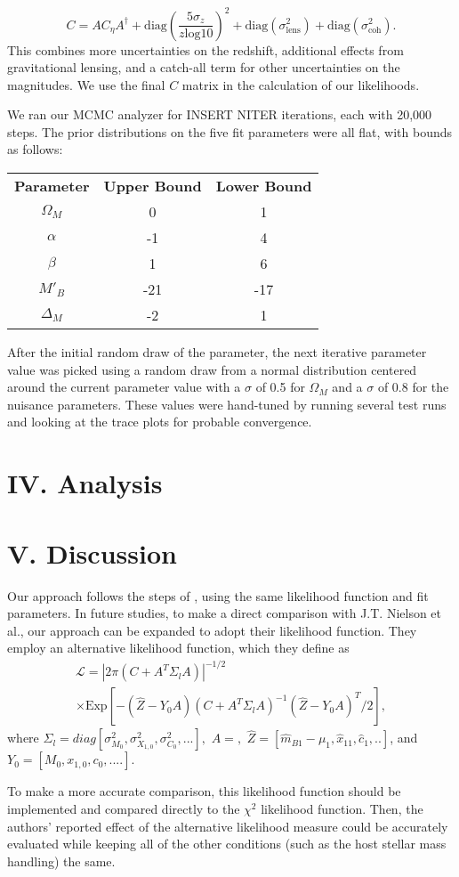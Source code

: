 \documentclass[aps,prl,reprint]{revtex4-1}
\begin{document}
$$C = A C_\eta A^\dagger + \text{diag}(\frac{5\sigma_z}{z \text{log} 10})^2 + \text{diag}(\sigma_\text{lens}^2) + \text{diag}(\sigma_{\text{coh}}^2). $$
This combines more uncertainties on the redshift, additional effects from gravitational lensing, and a catch-all term for other uncertainties on the magnitudes. We use the final $C$ matrix in the calculation of our likelihoods. 
\par We ran our MCMC analyzer for INSERT NITER iterations, each with 20,000 steps. The prior distributions on the five fit parameters were all flat, with bounds as follows:
\begin{center}
\begin{tabular}{ |c|c|c| } 
 \hline
 \textbf{Parameter} & \textbf{Upper Bound} & \textbf{Lower Bound} \\ 
 $\Omega_M$ & 0 & 1 \\ 
 $\alpha$ & -1 & 4 \\ 
 $\beta$ & 1 & 6 \\ 
 $M'_B$ & -21 & -17 \\ 
$\Delta_M$ & -2 & 1 \\ 
 \hline
\end{tabular}
\end{center}
\par After the initial random draw of the parameter, the next iterative parameter value was picked using a random draw from a normal distribution centered around the current parameter value with a $\sigma$ of 0.5 for $\Omega_M$ and a $\sigma$ of 0.8 for the nuisance parameters. These values were hand-tuned by running several test runs and looking at the trace plots for probable convergence. 
 
\section{IV. Analysis} 
\section{V. Discussion}
Our approach follows the steps of \cite{sdss}, using the same likelihood function and fit parameters. In future studies, to make a direct comparison with J.T. Nielson et al., our approach can be expanded to adopt their likelihood function. 
They employ an alternative likelihood function, which they define as \begin{align*}\mathscr{L} = |2\pi(C+A^T \Sigma_l A)|^{-1/2}\; \\
\times \text{Exp}[-(\hat{Z}-Y_0A)(C+A^T\Sigma_lA)^{-1}(\hat{Z}-Y_0A)^T/2],\end{align*} where $\Sigma_l = diag[\sigma_{M_0}^2,\sigma_{X_{1,0}}^2,\sigma_{C_0}^2,...],$ $A = ,$ $\hat{Z} = [\hat{m}_{B1}-\mu_1, \hat{x}_{11},\hat{c}_1,..]$, and $Y_0 = [M_0,x_{1,0},c_0,....]$. 
\par To make a more accurate comparison, this likelihood function should be implemented and compared directly to the $\chi^2$ likelihood function. Then, the authors' reported effect of the alternative likelihood measure could be accurately evaluated while keeping all of the other conditions (such as the host stellar mass handling) the same. 


 
 
\end{document}
